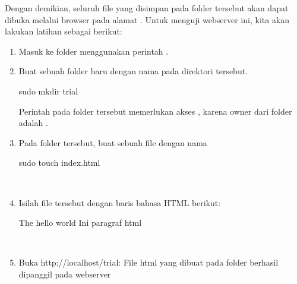 \documentclass[letterpaper,10pt,english]{sphinxmanual}
\begin{document}
Dengan demikian, seluruh file yang disimpan pada folder tersebut akan dapat dibuka melalui browser pada alamat .
Untuk menguji webserver ini, kita akan lakukan latihan sebagai berikut:
\begin{enumerate}
%
\item {} 
Masuk ke folder  menggunakan perintah .
 

\item {} 
Buat sebuah folder baru dengan nama  pada direktori  tersebut.

\begin{sphinxVerbatim}[commandchars=\\\{\}]
sudo mkdir trial
\end{sphinxVerbatim}

Perintah  pada folder tersebut memerlukan akses , karena owner dari folder adalah .
 

\item {} 
Pada folder tersebut, buat sebuah file dengan nama 

\begin{sphinxVerbatim}[commandchars=\\\{\}]
sudo touch index.html
\end{sphinxVerbatim}

 

\item {} 
Isilah file tersebut dengan baris bahasa HTML berikut:

\begin{sphinxVerbatim}[commandchars=\\\{\}]
 The hello world
 Ini paragraf html 
\end{sphinxVerbatim}

 

\item {} 
Buka http://localhost/trial:
File html yang dibuat pada folder berhasil dipanggil pada webserver

\end{enumerate}
\end{document}
